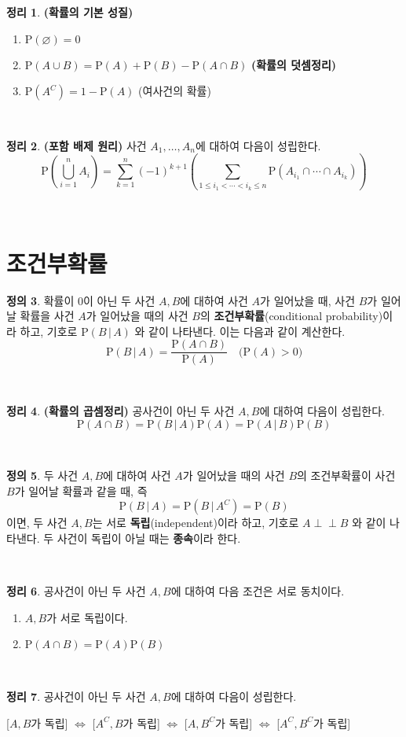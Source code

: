 \documentclass[12pt]{article}
\theoremstyle{definition}
\newtheorem{theorem}{\sffamily 정리}[section]
\theoremstyle{definition}
\newtheorem{definition}[theorem]{\sffamily 정의}
\newcommand{\defn}[1]{\begin{definition}#1\end{definition}~}
\newcommand{\thm}[1]{\begin{theorem}{#1}\end{theorem}~}
\newcommand{\pr}{\text{P}}
\newcommand{\indep}{\mathrel{\!\perp \!\!\!\perp\!}}
\begin{document}
\thm{\textbf{(확률의 기본 성질)} 
\begin{enumerate}
	\item[(1)] $\pr(\varnothing) = 0$
	\item[(2)] $\pr(A\cup B) = \pr(A) + \pr(B) - \pr(A\cap B)$ \quad \textbf{(확률의 덧셈정리)}
	\item[(3)] $\pr(A^C) = 1-\pr(A)$ \quad (여사건의 확률)
\end{enumerate}
}

\thm{\textbf{(포함 배제 원리)} 사건 $A_1, \dots, A_n$에 대하여 다음이 성립한다.
$$\pr\left(\bigcup_{i=1}^n A_i\right) = \sum_{k=1}^n (-1)^{k+1} \left(\sum_{1\leq i_1<\cdots< i_k\leq n} \pr\left(A_{i_1}\cap \cdots \cap A_{i_k}\right)\right)$$
}

\pagebreak
\section{조건부확률}
\defn{확률이 $0$이 아닌 두 사건 $A, B$에 대하여 사건 $A$가 일어났을 때, 사건 $B$가 일어날 확률을 사건 $A$가 일어났을 때의 사건 $B$의 \textbf{조건부확률}(conditional probability)이라 하고, 기호로 $\pr(B\,|\,A)$ 와 같이 나타낸다. 이는 다음과 같이 계산한다.$$\pr(B\,|\,A) = \frac{\pr(A\cap B)}{\pr(A)} \quad \big(\pr(A)>0\big)$$}

\thm{\textbf{(확률의 곱셈정리)} 공사건이 아닌 두 사건 $A, B$에 대하여 다음이 성립한다.$$\pr(A\cap B) = \pr(B\,|\,A)\pr(A) = \pr(A\,|\,B)\pr(B)$$}

\defn{두 사건 $A, B$에 대하여 사건 $A$가 일어났을 때의 사건 $B$의 조건부확률이 사건 $B$가 일어날 확률과 같을 때, 즉 $$\pr(B\,|\,A) = \pr(B\,|\,A^C) = \pr(B)$$ 이면, 두 사건 $A, B$는 서로 \textbf{독립}(independent)이라 하고, 기호로 $A\indep B$ 와 같이 나타낸다. 두 사건이 독립이 아닐 때는 \textbf{종속}이라 한다.}

\thm{공사건이 아닌 두 사건 $A, B$에 대하여 다음 조건은 서로 동치이다.
\begin{enumerate}
	\item[(1)] $A, B$가 서로 독립이다. \vspace{-3mm}
	\item[(2)] $\pr(A\cap B) = \pr(A)\pr(B)$
\end{enumerate}}

\thm{공사건이 아닌 두 사건 $A, B$에 대하여 다음이 성립한다.
\begin{center}
	[$A, B$가 독립] $\iff$ [$A^C, B$가 독립] $\iff$ [$A, B^C$가 독립] $\iff$ [$A^C, B^C$가 독립]
\end{center}}
\end{document}
